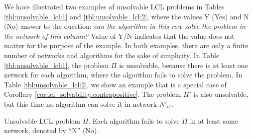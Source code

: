 We have illustrated two examples of unsolvable LCL problems in Tables \ref{tbl:unsolvable_lcl:1} and \ref{tbl:unsolvable_lcl:2}, where the values Y (Yes) and N (No) answer to the question: \emph{can the algorithm in this row solve the problem in the network of this column?}
Value of Y/N indicates that the value does not matter for the purpose of the example.
In both examples, there are only a finite number of networks and algorithms for the sake of simplicity.
In Table \ref{tbl:unsolvable_lcl:1}, the problem $\Pi$ is unsolvable, because there is at least one network for each algorithm, where the algorithm fails to solve the problem.
In Table \ref{tbl:unsolvable_lcl:2}, we show an example that is a special case of Corollary \ref{cor:lcl_solvability:contrapositive}.
The problem $\Pi'$ is also unsolvable, but this time no algorithm can solve it in network $N'_{n'}$.

\begin{table}[H]
    \parbox{.45\linewidth}{
    \centering
    \caption{
        Unsolvable LCL problem $\Pi$.
        Each algorithm fails to solve $\Pi$ in at least some network, denoted by ``N'' (No).
    }
    \label{tbl:unsolvable_lcl:1}
    }
    \hfill
    \parbox{.45\linewidth}{
        \centering
    \caption{
        Unsolvable LCL problem $\Pi'$.
        Each algorithm fails to solve $\Pi'$ at least in network $N'_{n'}$ (the last column containing only values ``N'').
    }
    \label{tbl:unsolvable_lcl:2}
    }
\end{table}

